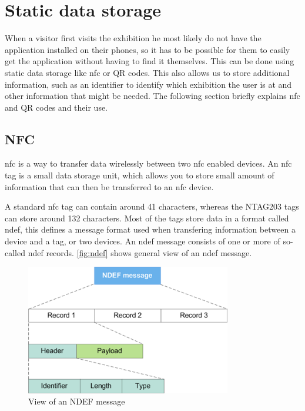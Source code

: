 \chapter{Static data storage}
When a visitor first visits the exhibition he most likely do not have the application installed on their phones, so it has to be possible for them to easily get the application without having to find it themselves. This can be done using static data storage like \ac{nfc} or QR codes. This also allows us to store additional information, such as an identifier to identify which exhibition the user is at and other information that might be needed. The following section briefly explains \ac{nfc} and QR codes and their use. 

\section*{NFC}
\ac{nfc} is a way to transfer data wirelessly  between two \ac{nfc} enabled devices. 
An \ac{nfc} tag is a small data storage unit, which allows you to store small amount of information that can then be transferred to an \ac{nfc} device. 

A standard \ac{nfc} tag can contain around 41 characters, whereas the NTAG203 tags can store around 132 characters\citep{nfccap}. Most of the tags store data in a format called \ac{ndef}, this defines a message format used when transfering information between a device and a tag, or two devices. An \ac{ndef} message consists of one or more of so-called \ac{ndef} records. \autoref{fig:ndef} shows general view of an \ac{ndef} message.

\begin{figure}[H]
\centering
\includegraphics[width=0.8\textwidth]{img/nfcrecord.png}
\caption{View of an NDEF message\citep{ndef}}
\label{fig:ndef}
\end{figure}


